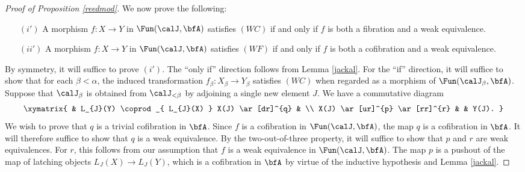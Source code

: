 \begin{proof}[Proof of Proposition \ref{reedmod}]
We now prove the following:
\begin{itemize}
\item[$(i')$] A morphism $f: X \rightarrow Y$ in $\Fun(\calJ, \bfA)$ satisfies $(WC)$ if and only if
$f$ is both a fibration and a weak equivalence.
\item[$(ii')$] A morphism $f: X \rightarrow Y$ in $\Fun(\calJ, \bfA)$ satisfies $(WF)$ if and only if $f$ is both a cofibration and a weak equivalence.
\end{itemize}
By symmetry, it will suffice to prove $(i')$. The ``only if'' direction follows from
Lemma \ref{jackal}. For the ``if'' direction, it will suffice to show that for
each $\beta < \alpha$, the induced transformation
$f_{\beta}: X_{\beta} \rightarrow Y_{\beta}$ satisfies $(WC)$ when regarded as a morphism
of $\Fun( \calJ_{\beta}, \bfA)$. Suppose that $\calJ_{\beta}$ is obtained from $\calJ_{< \beta}$ by adjoining a single new element $J$. We have a commutative diagram
$$ \xymatrix{ & L_{J}(Y) \coprod_{ L_{J}(X) } X(J) \ar[dr]^{q} & \\
X(J) \ar[ur]^{p} \ar[rr]^{r} & & Y(J). }$$
We wish to prove that $q$ is a trivial cofibration in $\bfA$. Since $f$ is a cofibration in $\Fun(\calJ, \bfA)$, the map $q$ is a cofibration in $\bfA$. It will therefore suffice to show that
$q$ is a weak equivalence. By the two-out-of-three property, it will suffice to show that
$p$ and $r$ are weak equivalences. For $r$, this follows from our assumption that
$f$ is a weak equivalence in $\Fun(\calJ, \bfA)$. The map $p$ is a pushout of the map of latching objects $L_{J}(X) \rightarrow L_{J}(Y)$, which is a cofibration in $\bfA$ by virtue of the inductive hypothesis and Lemma \ref{jackal}.


\end{proof}
